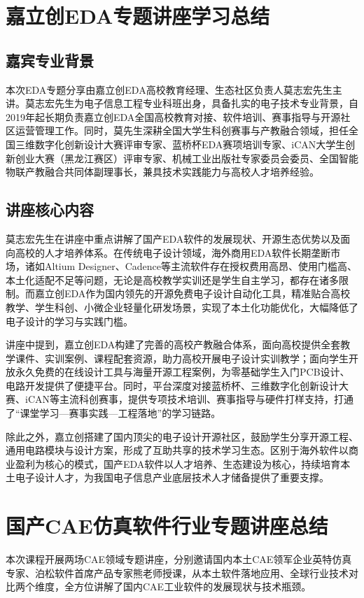 \documentclass[12pt,a4paper]{article}
\begin{document}
\section{嘉立创EDA专题讲座学习总结}
\subsection{嘉宾专业背景}
本次EDA专题分享由嘉立创EDA高校教育经理、生态社区负责人莫志宏先生主讲。莫志宏先生为电子信息工程专业科班出身，具备扎实的电子技术专业背景，自2019年起长期负责嘉立创EDA全国高校教育对接、软件培训、赛事指导与开源社区运营管理工作。同时，莫先生深耕全国大学生科创赛事与产教融合领域，担任全国三维数字化创新设计大赛评审专家、蓝桥杯EDA赛项培训专家、iCAN大学生创新创业大赛（黑龙江赛区）评审专家、机械工业出版社专家委员会委员、全国智能物联产教融合共同体副理事长，兼具技术实践能力与高校人才培养经验。

\subsection{讲座核心内容}
莫志宏先生在讲座中重点讲解了国产EDA软件的发展现状、开源生态优势以及面向高校的人才培养体系。在传统电子设计领域，海外商用EDA软件长期垄断市场，诸如Altium Designer、Cadence等主流软件存在授权费用高昂、使用门槛高、本土化适配不足等问题，无论是高校教学实训还是学生自主学习，都存在诸多限制。而嘉立创EDA作为国内领先的开源免费电子设计自动化工具，精准贴合高校教学、学生科创、小微企业轻量化研发场景，实现了本土化功能优化，大幅降低了电子设计的学习与实践门槛。

讲座中提到，嘉立创EDA构建了完善的高校产教融合体系，面向高校提供全套教学课件、实训案例、课程配套资源，助力高校开展电子设计实训教学；面向学生开放永久免费的在线设计工具与海量开源工程案例，为零基础学生入门PCB设计、电路开发提供了便捷平台。同时，平台深度对接蓝桥杯、三维数字化创新设计大赛、iCAN等主流科创赛事，提供专项技术培训、赛事指导与硬件打样支持，打通了“课堂学习—赛事实践—工程落地”的学习链路。

除此之外，嘉立创搭建了国内顶尖的电子设计开源社区，鼓励学生分享开源工程、通用电路模块与设计方案，形成了互助共享的技术学习生态。区别于海外软件以商业盈利为核心的模式，国产EDA软件以人才培养、生态建设为核心，持续培育本土电子设计人才，为我国电子信息产业底层技术人才储备提供了重要支撑。

\section{国产CAE仿真软件行业专题讲座总结}
本次课程开展两场CAE领域专题讲座，分别邀请国内本土CAE领军企业英特仿真专家、泊松软件首席产品专家熊老师授课，从本土软件落地应用、全球行业技术对比两个维度，全方位讲解了国内CAE工业软件的发展现状与技术瓶颈。
\end{document}
